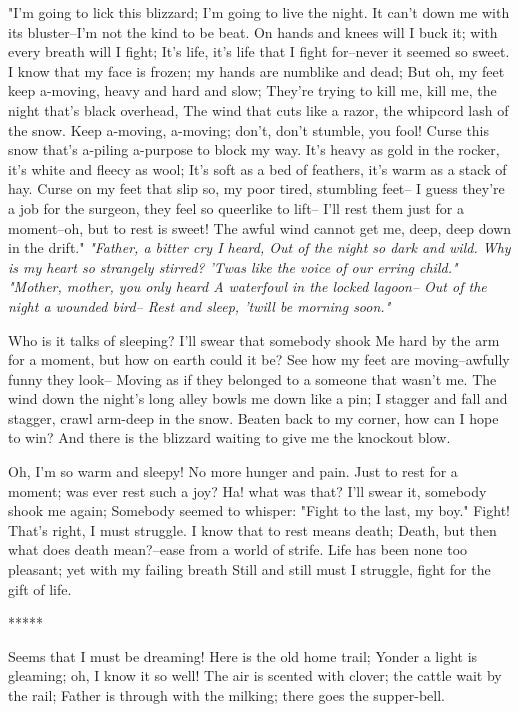 \begin{poemblock}
 "I'm going to lick this blizzard; I'm going to live the night.
  It can't down me with its bluster--I'm not the kind to be beat.
 On hands and knees will I buck it; with every breath will I fight;
  It's life, it's life that I fight for--never it seemed so sweet.
 I know that my face is frozen; my hands are numblike and dead;
  But oh, my feet keep a-moving, heavy and hard and slow;
 They're trying to kill me, kill me, the night that's black overhead,
  The wind that cuts like a razor, the whipcord lash of the snow.
 Keep a-moving, a-moving; don't, don't stumble, you fool!
  Curse this snow that's a-piling a-purpose to block my way.
 It's heavy as gold in the rocker, it's white and fleecy as wool;
  It's soft as a bed of feathers, it's warm as a stack of hay.
 Curse on my feet that slip so, my poor tired, stumbling feet--
  I guess they're a job for the surgeon, they feel so queerlike to lift--
 I'll rest them just for a moment--oh, but to rest is sweet!
  The awful wind cannot get me, deep, deep down in the drift."
\textit{
  "Father, a bitter cry I heard,
   Out of the night so dark and wild.
  Why is my heart so strangely stirred?
   'Twas like the voice of our erring child."
}
\textit{
  "Mother, mother, you only heard
   A waterfowl in the locked lagoon--
  Out of the night a wounded bird--
   Rest and sleep, 'twill be morning soon."
}

 Who is it talks of sleeping?  I'll swear that somebody shook
  Me hard by the arm for a moment, but how on earth could it be?
 See how my feet are moving--awfully funny they look--
  Moving as if they belonged to a someone that wasn't me.
 The wind down the night's long alley bowls me down like a pin;
  I stagger and fall and stagger, crawl arm-deep in the snow.
 Beaten back to my corner, how can I hope to win?
  And there is the blizzard waiting to give me the knockout blow.

 Oh, I'm so warm and sleepy!  No more hunger and pain.
  Just to rest for a moment; was ever rest such a joy?
 Ha! what was that?  I'll swear it, somebody shook me again;
  Somebody seemed to whisper:  "Fight to the last, my boy."
 Fight!  That's right, I must struggle.  I know that to rest means death;
  Death, but then what does death mean?--ease from a world of strife.
 Life has been none too pleasant; yet with my failing breath
  Still and still must I struggle, fight for the gift of life.

  *****

 Seems that I must be dreaming!  Here is the old home trail;
  Yonder a light is gleaming; oh, I know it so well!
 The air is scented with clover; the cattle wait by the rail;
  Father is through with the milking; there goes the supper-bell.


\end{poemblock}
